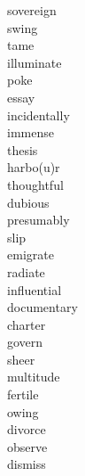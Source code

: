 \documentclass[a4paper, 11pt]{ctexart}
\begin{document}
\begin{multicols*}{3}
\begin{description}
\item[sovereign]

\item[swing]

\item[tame]

\item[illuminate]

\item[poke]

\item[essay]

\item[incidentally]

\item[immense]

\item[thesis]

\item[harbo(u)r]

\item[thoughtful]

\item[dubious]

\item[presumably]

\item[slip]

\item[emigrate]

\item[radiate]

\item[influential]

\item[documentary]

\item[charter]

\item[govern]

\item[sheer]

\item[multitude]

\item[fertile]

\item[owing]

\item[divorce]

\item[observe]

\item[dismiss]


\end{description}
\end{multicols*}
\end{document}
